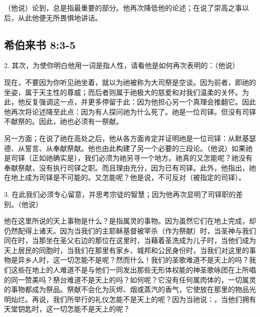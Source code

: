 （他说）论到，总是指最重要的部分。他再次降低他的论述；在说了崇高之事以后，从此他便无所畏惧地讲话。\par


\subsection{希伯来书 8:3-5}

2. 其次，为使你明白他用一词是指人性，请看他是如何再次表明的：（他说）\par

现在，不要因为你听见祂坐着，就以为祂被称为大司祭是空谈。因为前者，即祂的坐姿，属于天主性的尊威；而后者则属于祂极大的慈爱和对我们温柔的关怀。为此，他反复强调这一点，并更多停留于此：因为他担心另一个真理会推翻它。因此他再次将论述降至此点：因为有人探问祂为什么死了。祂是一位司铎。但没有司铎不献祭的。因此，祂也必须有一祭献。\par

另一方面；在说了祂在高处之后，他从各方面肯定并证明祂是一位司铎：从默基瑟德、从誓言、从奉献祭献。他也由此构建了另一个必要的三段论。（他说）如果祂是司铎（正如祂确实是），我们必须为祂另寻一个地方。祂真的又怎能呢？祂没有奉献祭献，没有执行司铎之职。而且理由充分，因为已有司铎。此外，他指出，祂在地上成为司铎是不可能的。又怎能呢？他是说，不可反对（被指定的司铎）。\par

3. 在此我们必须专心留意，并思考宗徒的智慧；因为他再次显明了司铎职的差别。（他说）\par

他在这里所说的天上事物是什么？是指属灵的事物。因为虽然它们在地上完成，却仍然配得上诸天。因为当我们的主耶稣基督被宰杀（作为祭献）时，当圣神与我们同在时，当那坐在圣父右边的那位在这里时，当藉着圣洗成为儿子时，当他们成为天上居民的同胞时，当我们在那里有家乡、城邦和公民身份时，当我们对这里的事物是异乡人时，这一切怎能不是呢？然而什么！我们的圣歌难道不是天上的吗？我们这些在地上的人难道不是与他们一同发出那些无形体权能的神圣歌咏团在上所唱的同一赞美吗？祭台难道不是天上的吗？如何呢？它没有任何属肉体的，一切属灵的事物都成为祭品。祭献不会化为灰烬、烟或蒸汽的香气，它使放在那里的物品光明灿烂。再说，我们所举行的礼仪怎能不是天上的呢？因为当祂说：，当他们拥有天堂钥匙时，这一切怎能不是天上的呢？\par

